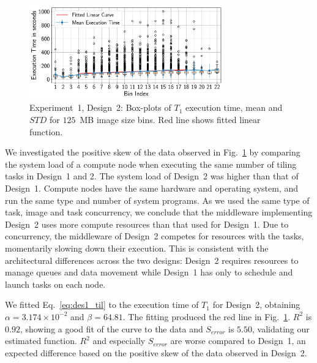 \begin{figure}[H]
    \centering
    \includegraphics[width=0.75\textwidth]{figures/designs/stage_0_tx_box_des2.pdf}
    \caption{Experiment~1, Design~2: Box-plots of $T_{1}$ execution time, mean and $STD$ for $125$~MB image size bins.
        Red line shows fitted linear function.}\label{fig:stage_1_execution_des2}
\end{figure}


We investigated the positive skew of the data observed in Fig.~\ref{fig:stage_1_execution_des2} by comparing the system load of a compute node when executing the same number of tiling tasks in Design~1 and 2.
The system load of Design~2 was higher than that of Design~1.
Compute nodes have the same hardware and operating system, and run the same type and number of system programs.
As we used the same type of task, image and task concurrency, we conclude that the middleware implementing Design~2 uses more compute resources than that used for Design~1.
Due to concurrency, the middleware of Design~2 competes for resources with the tasks, momentarily slowing down their execution.
This is consistent with the architectural differences across the two designs: Design~2 requires resources to manage queues and data movement while Design~1 has only to schedule and launch tasks on each node.

We fitted Eq.~\ref{eq:des1_til} to the execution time of $T_1$ for Design~2, obtaining $\alpha = 3.174 \times 10^{-2}$ and $\beta = 64.81$.
The fitting produced the red line in Fig.~\ref{fig:stage_1_execution_des2}.
$R^{2}$ is $0.92$, showing a good fit of the curve to the data and $S_{error}$ is $5.50$, validating our estimated function.
$R^2$ and especially $S_{error}$ are worse compared to Design~1, an expected difference based on the positive skew of the data observed in Design~2.


